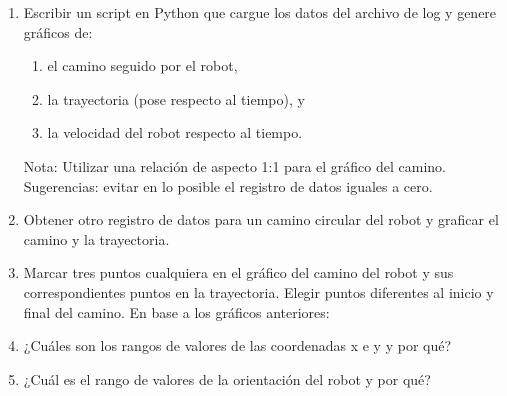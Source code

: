 \documentclass[tp]{lcc}
\begin{document}
\begin{enumerate}
\item Escribir un script en Python que cargue los datos del archivo de log y genere gráficos de:
\begin{enumerate}
	\item el camino seguido por el robot,
	\item la trayectoria (pose respecto al tiempo), y
	\item la velocidad del robot respecto al tiempo.
\end{enumerate} 
Nota: Utilizar una relación de aspecto 1:1 para el gráfico del camino.
Sugerencias: evitar en lo posible el registro de datos iguales a cero.
\item Obtener otro registro de datos para un camino circular del robot y graficar el camino y la trayectoria.
\item Marcar tres puntos cualquiera en el gráfico del camino del robot y sus correspondientes puntos en
la trayectoria. Elegir puntos diferentes al inicio y final del camino.
En base a los gráficos anteriores:
\item ¿Cuáles son los rangos de valores de las coordenadas x e y y por qué?
\item  ¿Cuál es el rango de valores de la orientación del robot y por qué?

\end{enumerate}


\printbibliography
\end{document}
